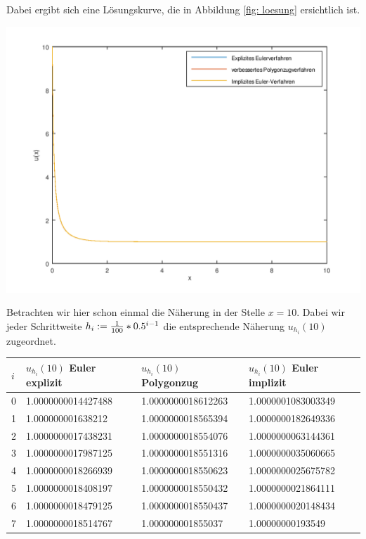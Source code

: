 \documentclass[ %
ngerman, %
a4paper, %
12pt, %
sectionreset, %
chapterstyle=framed, %
sectionstyle=dotted, %
titlefont=osfamily %
]{../../../../texmf/tex/latex/mathscriptMathTUD/mathscriptMathTUD}
\newcommand*\head{\rowfont{\bfseries}}
\begin{document}
    Dabei ergibt sich eine Lösungskurve, die in Abbildung \cref{fig: loesung} ersichtlich ist.
    \begin{center}
    	\includegraphics[width=.6\textwidth]{./loesung1.png}
    	\label{fig: loesung}
    \end{center}
    
    Betrachten wir hier schon einmal die Näherung in der Stelle $x=10$. Dabei wir jeder Schrittweite $h_i \mathrel{:=} \frac{1}{100} * 0.5^{i-1}$ die entsprechende Näherung $u_{h_i}(10)$ zugeordnet.
    
    {
    	\centering
    	\begin{tabu}{l|l|l|l}
	    	\toprule
	    	\head $i$ & $u_{h_i}(10)$ Euler explizit & $u_{h_i}(10)$ Polygonzug & $u_{h_i}(10)$ Euler implizit\\
	    	\midrule {} & 1.0000000014427488 & 1.0000000018612263 & 1.0000001083003349 \\
	    	1 & 1.000000001638212  & 1.0000000018565394 & 1.0000000182649336 \\
	    	2 & 1.0000000017438231 &  1.0000000018554076 & 1.0000000063144361 \\
	    	3 & 1.0000000017987125 & 1.0000000018551316 & 1.0000000035060665 \\
	    	4 & 1.0000000018266939 & 1.0000000018550623 & 1.0000000025675782 \\
	    	5 & 1.0000000018408197 & 1.0000000018550432 & 1.0000000021864111 \\
	    	6 & 1.0000000018479125 & 1.0000000018550437 & 1.0000000020148434 \\
	    	7 & 1.0000000018514767 & 1.000000001855037 & 1.00000000193549 \\
	    	\bottomrule
	    \end{tabu}
		\label{tab: expeu_1}
    }
\end{document}
